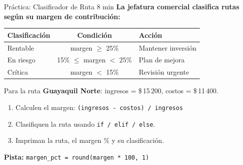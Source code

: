 \documentclass[aspectratio=169, 11pt]{beamer}
\begin{document}
\begin{frame}[fragile,shrink=30]{Práctica: Clasificador de Ruta \hfill {\normalsize\color{arcaRed}\faClock\hspace{4pt}8 min}}
  \vspace{-6pt}
  {\small\color{arcaDark}\bfseries
    La jefatura comercial clasifica rutas según su margen de contribución:}

  \vspace{6pt}
  \begin{center}
  {\footnotesize
  \renewcommand{\arraystretch}{1.2}
  \begin{tabular}{l c l}
    \toprule
    {\bfseries\color{arcaDark} Clasificación}
    & {\bfseries\color{arcaDark} Condición}
    & {\bfseries\color{arcaDark} Acción} \\
    \midrule
    Rentable  & margen $\geq$ 25\% & Mantener inversión \\
    En riesgo & 15\% $\leq$ margen $<$ 25\% & Plan de mejora \\
    Crítica   & margen $<$ 15\%   & Revisión urgente \\
    \bottomrule
  \end{tabular}
  }
  \end{center}

  \vspace{4pt}
  {\footnotesize\color{textMuted}
    Para la ruta \textbf{Guayaquil Norte}:
    ingresos = \$\,15\,200, costos = \$\,11\,400.}

  \vspace{2pt}
  {\footnotesize
  \begin{enumerate}\setlength{\itemsep}{2pt}
    \item[{\color{arcaRed}\bfseries 1.}]
      Calculen el margen: \texttt{(ingresos - costos) / ingresos}
    \item[{\color{arcaRed}\bfseries 2.}]
      Clasifiquen la ruta usando \texttt{if / elif / else}.
    \item[{\color{arcaRed}\bfseries 3.}]
      Impriman la ruta, el margen \% y su clasificación.
  \end{enumerate}
  }

  \vspace{3pt}
  {\scriptsize\color{textMuted}
    \faLightbulb[regular]\hspace{4pt}\textbf{Pista:}
    \texttt{margen\_pct = round(margen * 100, 1)}}
\end{frame}
\end{document}
